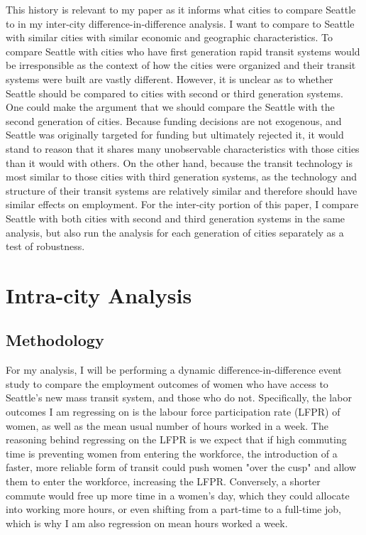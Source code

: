 \documentclass[A4paper,12pt]{article}
\begin{document}
This history is relevant to my paper as it informs what cities to compare Seattle to in my inter-city difference-in-difference analysis. I want to compare to Seattle with similar cities with similar economic and geographic characteristics. To compare Seattle with cities who have first generation rapid transit systems would be irresponsible as the context of how the cities were organized and their transit systems were built are vastly different. However, it is unclear as to whether Seattle should be compared to cities with second or third generation systems. One could make the argument that we should compare the Seattle with the second generation of cities. Because funding decisions are not exogenous, and Seattle was originally targeted for funding but ultimately rejected it, it would stand to reason that it shares many unobservable characteristics with those cities than it would with others. On the other hand, because the transit technology is most similar to those cities with third generation systems, as the technology and structure of their transit systems are relatively similar and therefore should have similar effects on employment. For the inter-city portion of this paper, I compare Seattle with both cities with second and third generation systems in the same analysis, but also run the analysis for each generation of cities separately as a test of robustness.\\ 

\section{Intra-city Analysis}

\subsection{Methodology}

For my analysis, I will be performing a dynamic difference-in-difference event study to compare the employment outcomes of women who have access to Seattle's new mass transit system, and those who do not. Specifically, the labor outcomes I am regressing on is the labour force participation rate (LFPR) of women, as well as the mean usual number of hours worked in a week. The reasoning behind regressing on the LFPR is we expect that if high commuting time is preventing women from entering the workforce, the introduction of a faster, more reliable form of transit could push women "over the cusp" and allow them to enter the workforce, increasing the LFPR. Conversely, a shorter commute would free up more time in a women's day, which they could allocate into working more hours, or even shifting from a part-time to a full-time job, which is why I am also regression on mean hours worked a week. \\
\end{document}
